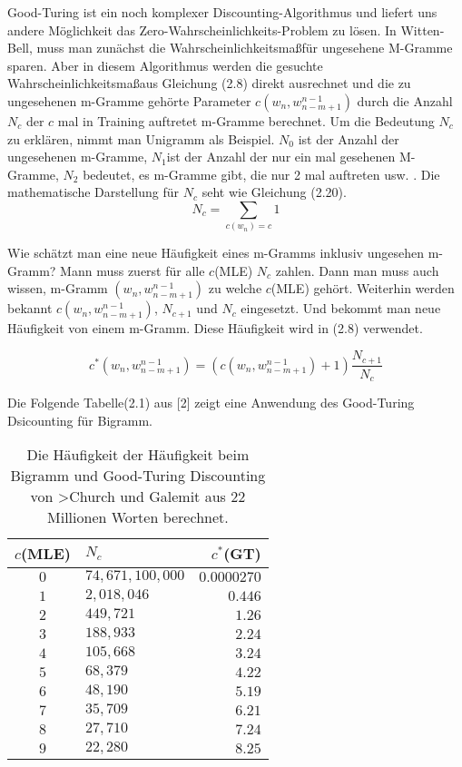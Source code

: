 Good-Turing ist ein noch komplexer Discounting-Algorithmus und liefert uns andere M\"oglichkeit  das Zero-Wahrscheinlichkeits-Problem zu l\"osen. In Witten-Bell, muss man zun\"achst die Wahrscheinlichkeitsma\ss f\"ur ungesehene M-Gramme sparen. Aber in diesem Algorithmus werden die gesuchte Wahrscheinlichkeitsma\ss aus Gleichung (2.8) direkt ausrechnet und die zu ungesehenen m-Gramme geh\"orte Parameter $c(w_{n},w_{n-m+1}^{n-1})$ durch die Anzahl $N_{c}$ der  $c$ mal in Training auftretet m-Gramme berechnet. Um die Bedeutung $N_{c}$ zu erkl\"aren, nimmt man Unigramm als Beispiel. $N_{0}$ ist der Anzahl der ungesehenen m-Gramme, $N_{1}$ist der Anzahl der nur ein mal gesehenen M-Gramme, $N_{2}$ bedeutet, es   m-Gramme gibt, die nur 2 mal auftreten usw. . Die mathematische Darstellung f\"ur $N_{c}$ seht wie Gleichung (2.20).
\begin{equation}
N_{c}=\sum_{c(w_{n})=c}1
\end{equation}

Wie sch\"atzt man eine neue H\"aufigkeit eines m-Gramms inklusiv ungesehen m-Gramm? Mann muss zuerst f\"ur alle $c$(MLE) $N_{c}$ zahlen. Dann man muss auch wissen, m-Gramm $(w_{n},w_{n-m+1}^{n-1})$ zu welche $c$(MLE) geh\"ort. Weiterhin werden bekannt $c(w_{n},w_{n-m+1}^{n-1})$, $N_{c+1}$ und $N_{c}$ eingesetzt. Und bekommt man neue H\"aufigkeit von einem m-Gramm. Diese H\"aufigkeit wird in (2.8) verwendet.

\begin{equation}
c^{*}(w_{n},w_{n-m+1}^{n-1})=(c(w_{n},w_{n-m+1}^{n-1})+1)\frac{N_{c+1}}{N_{c}}
\end{equation}

Die Folgende Tabelle(2.1)  aus [2] zeigt eine Anwendung des Good-Turing Dsicounting f\"ur Bigramm.

\begin{table}[h]
  \begin{center}
    \begin{tabular}{clr}
      \toprule
      \bf $c$(MLE) & \bf $N_{c}$ & \bf $c^{*}$(GT)\\      
      \midrule
      $0$ &  $74,671,100,000$ & $0.0000270$  \\
      $1$ &  $2,018,046$ 			& $0.446$  \\
      $2$ &  $449,721$ 				& $1.26$  \\
      $3$ &  $188,933$ 				& $2.24$  \\
      $4$ &  $105,668$ 				& $3.24$  \\
      $5$ &  $68,379$ 				& $4.22$  \\
      $6$ &  $48,190$ 				& $5.19$  \\
      $7$ &  $35,709$ 				& $6.21$  \\
      $8$ &  $27,710$ 				& $7.24$  \\
      $9$ &  $22,280$ 				& $8.25$  \\
      \bottomrule
    \end{tabular}
  \end{center}
\caption{Die H\"aufigkeit der H\"aufigkeit beim Bigramm und Good-Turing Discounting von >Church und Galemit aus 22 Millionen Worten berechnet.}
\label{tab:table_1}
\end{table}

